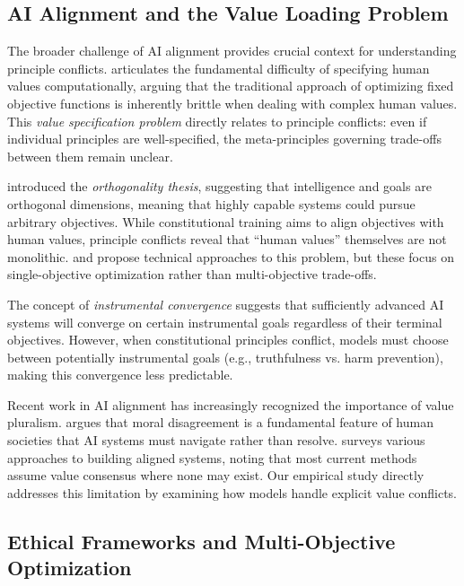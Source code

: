 \documentclass[11pt,a4paper]{article}
\begin{document}
\subsection{AI Alignment and the Value Loading Problem}

The broader challenge of AI alignment provides crucial context for understanding principle conflicts. \citet{russell2019human} articulates the fundamental difficulty of specifying human values computationally, arguing that the traditional approach of optimizing fixed objective functions is inherently brittle when dealing with complex human values. This \textit{value specification problem} directly relates to principle conflicts: even if individual principles are well-specified, the meta-principles governing trade-offs between them remain unclear.

\citet{yudkowsky2016ai} introduced the \textit{orthogonality thesis}, suggesting that intelligence and goals are orthogonal dimensions, meaning that highly capable systems could pursue arbitrary objectives. While constitutional training aims to align objectives with human values, principle conflicts reveal that ``human values'' themselves are not monolithic. \citet{soares2015corrigibility} and \citet{taylor2016quantilizers} propose technical approaches to this problem, but these focus on single-objective optimization rather than multi-objective trade-offs.

The concept of \textit{instrumental convergence} \citep{omohundro2008basic, bostrom2014superintelligence} suggests that sufficiently advanced AI systems will converge on certain instrumental goals regardless of their terminal objectives. However, when constitutional principles conflict, models must choose between potentially instrumental goals (e.g., truthfulness vs. harm prevention), making this convergence less predictable.

Recent work in AI alignment has increasingly recognized the importance of value pluralism. \citet{gabriel2020artificial} argues that moral disagreement is a fundamental feature of human societies that AI systems must navigate rather than resolve. \citet{hendrycks2023overview} surveys various approaches to building aligned systems, noting that most current methods assume value consensus where none may exist. Our empirical study directly addresses this limitation by examining how models handle explicit value conflicts.

\subsection{Ethical Frameworks and Multi-Objective Optimization}
\end{document}
